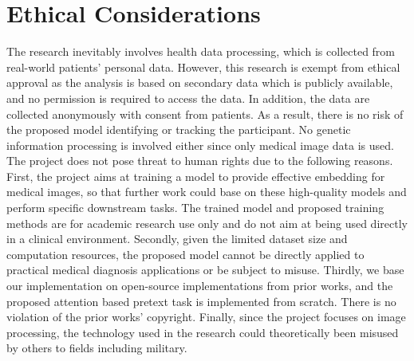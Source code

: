 \documentclass[12pt,twoside]{report}
\begin{document}




\chapter{Ethical Considerations}
The research inevitably involves health data processing, which is collected from real-world patients' personal data. However, this research is exempt from ethical approval as the analysis is based on secondary data which is publicly available, and no permission is required to access the data. In addition, the data are collected anonymously with consent from patients. As a result, there is no risk of the proposed model identifying or tracking the participant. No genetic information processing is involved either since only medical image data is used. \\

The project does not pose threat to human rights due to the following reasons. First, the project aims at training a model to provide effective embedding for medical images, so that further work could base on these high-quality models and perform specific downstream tasks. The trained model and proposed training methods are for academic research use only and do not aim at being used directly in a clinical environment. Secondly, given the limited dataset size and computation resources, the proposed model cannot be directly applied to practical medical diagnosis applications or be subject to misuse. Thirdly, we base our implementation on open-source implementations from prior works, and the proposed attention based pretext task is implemented from scratch. There is no violation of the prior works' copyright. Finally, since the project focuses on image processing, the technology used in the research could theoretically been misused by others to fields including military. 
\end{document}
